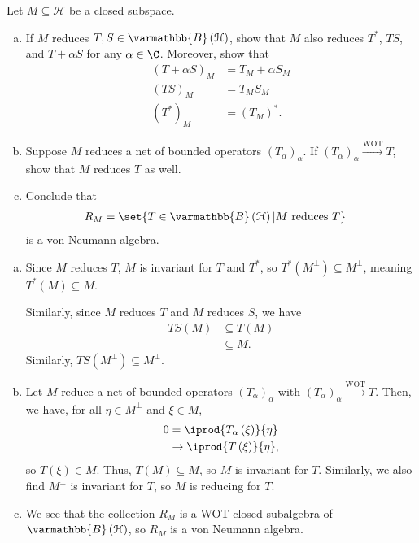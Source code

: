 \documentclass[10pt]{mypackage}
\renewcommand*{\mathbb}[1]{\varmathbb{#1}}
\newcommand{\B}{\mathbb{B}}
\begin{document}
\begin{exercise}
  Let $M\subseteq \mathcal{H}$ be a closed subspace.
  \begin{enumerate}[(a)]
    \item If $M$ reduces $T,S\in \B\left(\mathcal{H}\right)$, show that $M$ also reduces $T^{\ast}$, $TS$, and $T + \alpha S$ for any $\alpha \in \C$. Moreover, show that
      \begin{align*}
        \left(T + \alpha S\right)_{M} &= T_M + \alpha S_M\\
        \left(TS\right)_M &= T_MS_M\\
        \left(T^{\ast}\right)_{M} &= \left(T_M\right)^{\ast}.
      \end{align*}
    \item Suppose $M$ reduces a net of bounded operators $\left(T_{\alpha}\right)_{\alpha}$. If $\left(T_{\alpha}\right)_{\alpha}\xrightarrow{\text{WOT}} T$, show that $M$ reduces $T$ as well.
    \item Conclude that
      \begin{align*}
        R_M &= \set{T\in \B\left(\mathcal{H}\right) | M\text{ reduces }T}
      \end{align*}
      is a von Neumann algebra.
  \end{enumerate}
\end{exercise}
\begin{solution}\hfill
  \begin{enumerate}[(a)]
    \item Since $M$ reduces $T$, $M$ is invariant for $T$ and $T^{\ast}$, so $T^{\ast}\left(M^{\perp}\right)\subseteq M^{\perp}$, meaning $T^{\ast}\left(M\right) \subseteq M$.\newline

      Similarly, since $M$ reduces $T$ and $M$ reduces $S$, we have
      \begin{align*}
        TS\left(M\right)&\subseteq T\left(M\right)\\
        &\subseteq M.
      \end{align*}
      Similarly, $TS\left(M^{\perp}\right) \subseteq M^{\perp}$.
    \item Let $M$ reduce a net of bounded operators $\left(T_{\alpha}\right)_{\alpha}$ with $\left(T_{\alpha}\right)_{\alpha}\xrightarrow{\text{WOT}}T$. Then, we have, for all $\eta\in M^{\perp}$ and $\xi \in M$,
      \begin{align*}
        0 &= \iprod{T_{\alpha}\left(\xi\right)}{\eta}\\
          &\rightarrow \iprod{T\left(\xi\right)}{\eta},
      \end{align*}
      so $T\left(\xi\right)\in M$. Thus, $T\left(M\right)\subseteq M$, so $M$ is invariant for $T$. Similarly, we also find $M^{\perp}$ is invariant for $T$, so $M$ is reducing for $T$.
    \item We see that the collection $R_M$ is a WOT-closed subalgebra of $\B\left(\mathcal{H}\right)$, so $R_M$ is a von Neumann algebra.
  \end{enumerate}
\end{solution}
\end{document}
